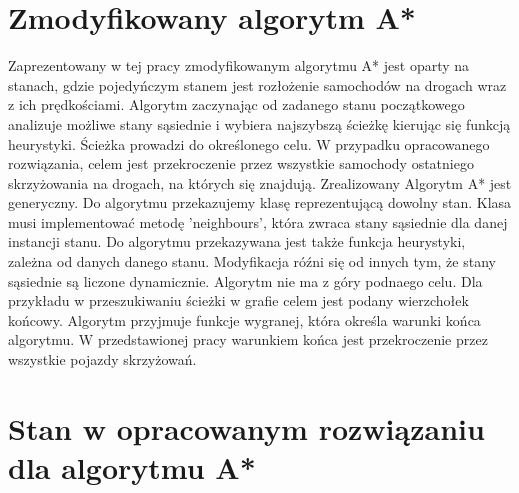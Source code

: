 \section{Zmodyfikowany algorytm A*}

Zaprezentowany w tej pracy zmodyfikowanym algorytmu A* jest oparty na stanach, gdzie pojedyńczym stanem jest rozłożenie samochodów na drogach wraz z ich prędkościami. Algorytm zaczynając od zadanego stanu początkowego analizuje możliwe stany sąsiednie i wybiera najszybszą ścieżkę kierując się funkcją heurystyki. Ścieżka prowadzi do określonego celu. W przypadku opracowanego rozwiązania, celem jest przekroczenie przez wszystkie samochody ostatniego skrzyżowania na drogach, na których się znajdują.
\newline
\indent
Zrealizowany Algorytm A* jest generyczny. Do algorytmu przekazujemy klasę reprezentującą dowolny stan. Klasa musi implementować metodę 'neighbours', która zwraca stany sąsiednie dla danej instancji stanu. Do algorytmu przekazywana jest także funkcja heurystyki, zależna od danych danego stanu.
\newline
\indent
Modyfikacja róźni się od innych tym, że stany sąsiednie są liczone dynamicznie. Algorytm nie ma z góry podnaego celu. Dla przykładu w przeszukiwaniu ścieżki w grafie celem jest podany wierzchołek końcowy. Algorytm przyjmuje funkcje wygranej, która określa warunki końca algorytmu. W przedstawionej pracy warunkiem końca jest przekroczenie przez wszystkie pojazdy skrzyżowań.

\section{Stan w opracowanym rozwiązaniu dla algorytmu A*}

